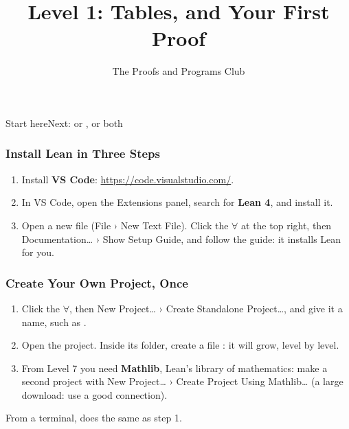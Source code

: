 \documentclass{ltx-talk}
\title{Level 1: Tables, and Your First Proof}
\author{The Proofs and Programs Club}
\institute{Royal Holloway, University of London}
\begin{document}
  {Start here}{Next:  or , or both}



\begin{frame}
  \frametitle{Install Lean in Three Steps}
  \begin{enumerate}
    \item Install \textbf{VS Code}: \url{https://code.visualstudio.com/}.
    \item In VS Code, open the Extensions panel, search for
      \textbf{Lean 4}, and install it.
    \item Open a new file (File › New Text File). Click the
      \textbf{$\forall$} at the top right, then Documentation… › Show
      Setup Guide, and follow the guide: it installs Lean for you.
  \end{enumerate}
  \setuptag
\end{frame}

\begin{frame}
  \frametitle{Create Your Own Project, Once}
  \begin{enumerate}
    \item Click the \textbf{$\forall$}, then New Project… › Create
      Standalone Project…, and give it a name, such as .
    \item Open the project. Inside its folder, create a file
      : it will grow, level by level.
    \item From Level 7 you need \textbf{Mathlib}, Lean's library of
      mathematics: make a second project with New Project… › Create
      Project Using Mathlib… (a large download: use a good connection).
  \end{enumerate}
  From a terminal,  does the same as step 1.
  \setuptag
\end{frame}
\end{document}
